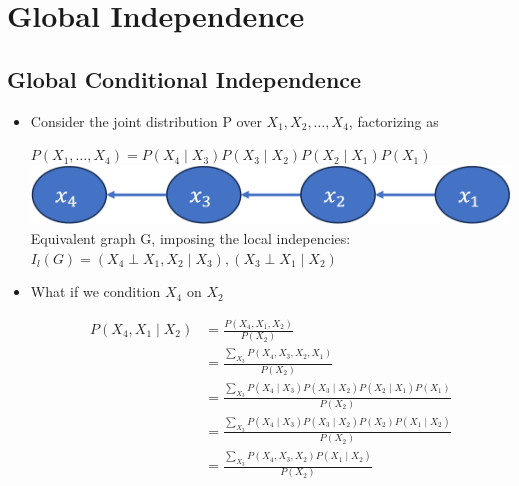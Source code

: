 \documentclass[11pt,a4paper]{report}
\begin{document}

\chapter{Global Independence}

\section{Global Conditional Independence}

\begin{itemize}
    \item Consider the joint distribution P over $X_{1}, X_{2}, \ldots, X_{4}$, factorizing as
    \begin{center}
        $P(X_{1}, \ldots, X_{4}) = P(X_{4} \mid X_{3}) P(X_{3} \mid X_{2}) P(X_{2} \mid X_{1})P(X_{1})$\\
        \vspace{0.5cm}
        \includegraphics{global_indep1.png}\\
        \vspace{0.5cm}
        Equivalent graph G, imposing the local indepencies:\\
        \vspace{0.5cm}
        $I_{l}(G) = {(X_{4} \perp X_{1}, X_{2} \mid X_{3}), (X_{3} \perp X_{1} \mid X_{2})}$
    \end{center}
    \item What if we condition $X_{4}$ on $X_{2}$
    \begin{center}
    \begin{equation}
    \begin{split}
        P(X_{4},X_{1} \mid X_{2}) & = \frac{P(X_{4},X_{1},X_{2})}{P(X_{2})}\\
        & = \frac{\sum_{X_{3}}P(X_{4},X_{3},X_{2},X_{1})}{P(X_{2})} \\
        & = \frac{\sum_{X_{3}}P(X_{4} \mid X_{3})P(X_{3} \mid X_{2})P(X_{2} \mid X_{1})P(X_{1})}{P(X_{2})} \\
        & = \frac{\sum_{X_{3}}P(X_{4} \mid X_{3})P(X_{3} \mid X_{2})P(X_{2})P(X_{1} \mid X_{2})}{P(X_{2})} \\
        & = \frac{\sum_{X_{3}}P(X_{4},X_{3},X_{2})P(X_{1} \mid X_{2})}{P(X_{2})} \\

\end{split}
\end{equation}
\end{center}
\end{itemize}
\end{document}
